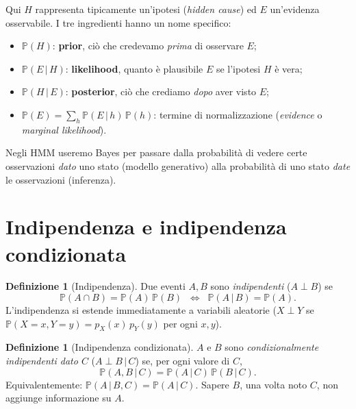 \documentclass[11pt,a4paper,oneside]{book}
\theoremstyle{plain}
\theoremstyle{definition}
\newtheorem{definizione}[teorema]{Definizione}
\theoremstyle{remark}
\newcommand{\Prob}{\mathbb{P}}
\newcommand{\given}{\,\vert\,}
\begin{document}
Qui $H$ rappresenta tipicamente un'ipotesi (\emph{hidden cause}) ed
$E$ un'evidenza osservabile. I tre ingredienti hanno un nome
specifico:

\begin{tcolorbox}[notebox,title=Anatomia del Teorema di Bayes]
\begin{itemize}[leftmargin=*]
    \item $\Prob(H)$: \textbf{prior}, ciò che credevamo \emph{prima} di
          osservare $E$;
    \item $\Prob(E\given H)$: \textbf{likelihood}, quanto è plausibile
          $E$ se l'ipotesi $H$ è vera;
    \item $\Prob(H\given E)$: \textbf{posterior}, ciò che crediamo
          \emph{dopo} aver visto $E$;
    \item $\Prob(E)=\sum_h \Prob(E\given h)\,\Prob(h)$: termine di
          normalizzazione (\emph{evidence} o \emph{marginal likelihood}).
\end{itemize}
\end{tcolorbox}

Negli HMM useremo Bayes per passare dalla probabilità di vedere certe
osservazioni \emph{dato} uno stato (modello generativo) alla
probabilità di uno stato \emph{date} le osservazioni (inferenza).

\section{Indipendenza e indipendenza condizionata}

\begin{definizione}[Indipendenza]
Due eventi $A,B$ sono \emph{indipendenti} ($A\perp B$) se
\begin{equation}
    \Prob(A\cap B) = \Prob(A)\,\Prob(B)
    \;\;\Longleftrightarrow\;\;
    \Prob(A\given B) = \Prob(A).
\end{equation}
L'indipendenza si estende immediatamente a variabili aleatorie
($X\perp Y$ se $\Prob(X=x,Y=y)=p_X(x)\,p_Y(y)$ per ogni $x,y$).
\end{definizione}

\begin{definizione}[Indipendenza condizionata]
$A$ e $B$ sono \emph{condizionalmente indipendenti dato $C$}
($A\perp B\given C$) se, per ogni valore di $C$,
\begin{equation}
    \Prob(A,B\given C) = \Prob(A\given C)\,\Prob(B\given C).
    \label{eq:cond_indep}
\end{equation}
Equivalentemente: $\Prob(A\given B,C) = \Prob(A\given C)$. Sapere $B$,
una volta noto $C$, non aggiunge informazione su $A$.
\end{definizione}
\end{document}
